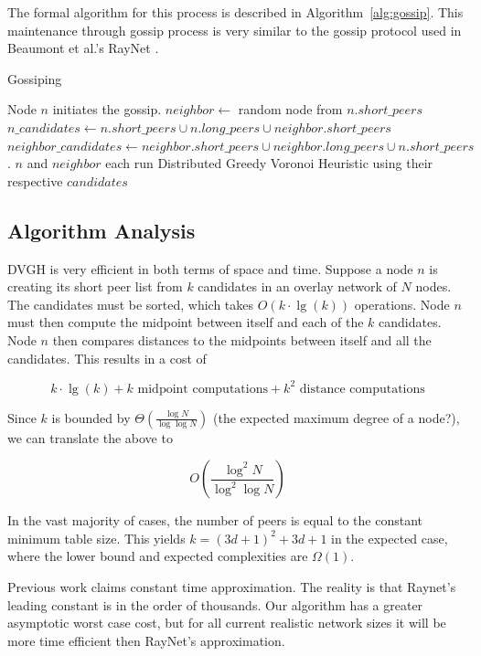 \documentclass[11pt, conference, letterpaper]{IEEEtran}
\begin{document}
The formal algorithm for this process is described in Algorithm~\ref{alg:gossip}.
This maintenance through gossip process is very similar to the gossip protocol used in Beaumont et al.'s RayNet \cite{raynet}.


\begin{algorithm}
\caption{Gossiping}
\label{alg:gossip}
\begin{algorithmic}[1]  %
	\STATE Node $n$ initiates the gossip.
	\STATE $neighbor \leftarrow$ random node from $n.short\_peers$
   \STATE $n\_candidates \leftarrow n.short\_peers \cup n.long\_peers \cup neighbor.short\_peers$
   \STATE $neighbor\_candidates \leftarrow neighbor.short\_peers \cup neighbor.long\_peers \cup n.short\_peers$.  
   \STATE $n$ and $neighbor$ each run Distributed Greedy Voronoi Heuristic using their respective $candidates$
\end{algorithmic} 
\end{algorithm}


\subsection{Algorithm Analysis}

DVGH is very efficient in both terms of space and time.
Suppose a node $n$ is creating its short peer list from $k$ candidates in an overlay network of $N$ nodes. 
The candidates must be sorted, which takes $O(k\cdot\lg(k))$ operations.  
Node $n$ must then compute the midpoint between itself and each of the $k$ candidates.  
Node $n$ then compares distances to the midpoints between itself and all the candidates.  
This results in a cost of 

\[ k\cdot\lg(k) + k \text{ midpoint computations}  + k^{2} \text{ distance computations} \]


Since $k$ is  bounded by $\Theta(\frac{\log N}{\log \log N} )$ \cite{bern1991expected} (the expected maximum degree of a node?), we can translate the above to

\[O(\frac{\log^{2} N}{\log^{2} \log N} )\]

In the vast majority of cases, the number of peers is equal to the constant minimum table size. 
This yields $k=(3d+1)^2+3d+1$ in the expected case, where the lower bound and expected complexities are $\Omega(1)$.

Previous work \cite{raynet} claims constant time approximation. 
The reality is that Raynet's leading constant is in the order of thousands. %
Our algorithm has a greater asymptotic worst case cost, but for all current realistic network sizes it will be more time efficient then RayNet's approximation.
\end{document}
